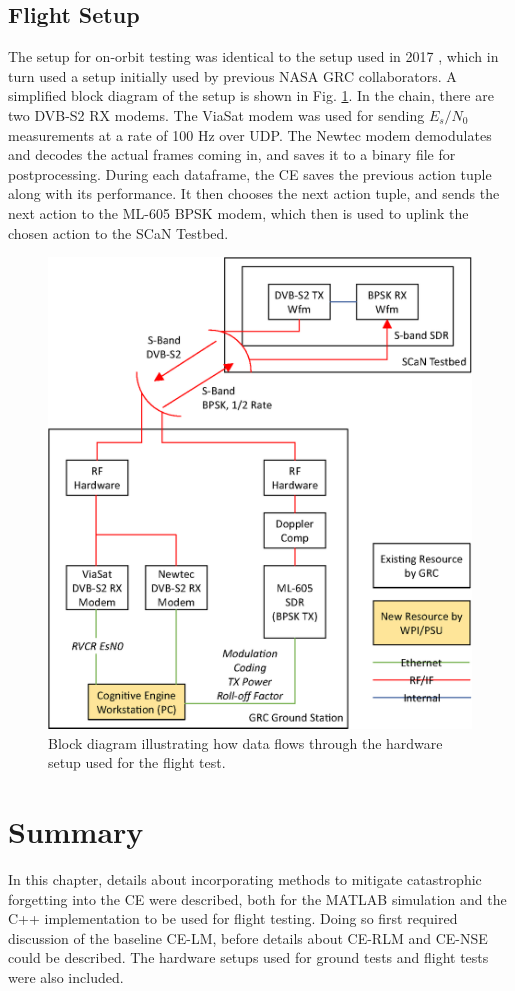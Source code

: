 \subsection{Flight Setup}
\par The setup for on-orbit testing was identical to the setup used in 2017 \cite{tim_implementation_paper}, which in turn used a setup initially used by previous NASA GRC collaborators. A simplified block diagram of the setup is shown in Fig. \ref{methods:flightTestFig}. In the chain, there are two DVB-S2 RX modems. The ViaSat modem was used for sending $E_s/N_0$ measurements at a rate of 100 Hz over UDP. The Newtec modem demodulates and decodes the actual frames coming in, and saves it to a binary file for postprocessing. During each dataframe, the CE saves the previous action tuple along with its performance. It then chooses the next action tuple, and sends the next action to the ML-605 BPSK modem, which then is used to uplink the chosen action to the SCaN Testbed.

\begin{figure}[ht]
\includegraphics{figures/system_block_diagram.eps}
\caption{Block diagram illustrating how data flows through the hardware setup used for the flight test.}\label{methods:flightTestFig}
\end{figure} 
\clearpage
\section{Summary}
\par In this chapter, details about incorporating methods to mitigate catastrophic forgetting into the CE were described, both for the MATLAB simulation and the C++ implementation to be used for flight testing. Doing so first required discussion of the baseline CE-LM, before details about CE-RLM and CE-NSE could be described. The hardware setups used for ground tests and flight tests were also included.